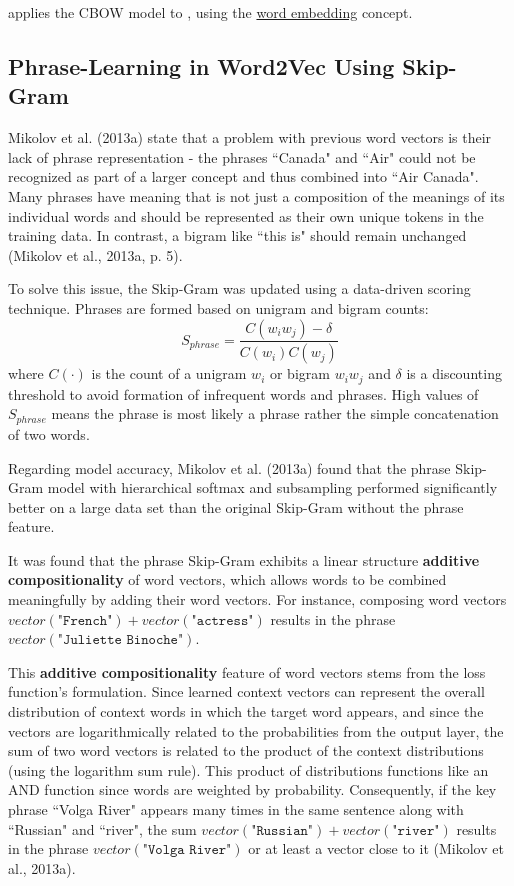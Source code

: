  applies the CBOW model to , using the \hyperref[sec:WordEmbeddings]{word embedding} concept. 


\subsection{Phrase-Learning in Word2Vec Using Skip-Gram}

Mikolov et al. (2013a) state that a problem with previous word vectors is their lack of phrase representation - the phrases ``Canada" and ``Air" could not be recognized as part of a larger concept and thus combined into ``Air Canada". Many phrases have meaning that is not just a composition of the meanings of its individual words and should be represented as their own unique tokens in the training data. In contrast, a bigram like ``this is" should remain unchanged (Mikolov et al., 2013a, p. 5). 

To solve this issue, the Skip-Gram was updated using a data-driven scoring technique. Phrases are formed based on unigram and bigram counts: 
$$
S_{phrase} = \frac{C(w_i w_j) - \delta} {C(w_i)C(w_j)}
$$
where $C(\cdot)$ is the count of a unigram $w_i$ or bigram $w_i w_j$ and $\delta$ is a discounting threshold to avoid formation of infrequent words and phrases. High values of $S_{phrase}$ means the phrase is most likely a phrase rather the simple concatenation of two words. 

Regarding model accuracy, Mikolov et al. (2013a) found that the phrase Skip-Gram model with hierarchical softmax and subsampling performed significantly better on a large data set than the original Skip-Gram without the phrase feature. 

It was found that the phrase Skip-Gram exhibits a linear structure \textbf{additive compositionality} of word vectors, which allows words to be combined meaningfully by adding their word vectors. For instance, composing word vectors $vector(\texttt{"French"}) \! + \! vector(\texttt{"actress"})$ results in the phrase $vector(\texttt{"Juliette Binoche"})$. 

This \textbf{additive compositionality} feature of word vectors stems from the loss function's formulation. Since learned context vectors can represent the overall distribution of context words in which the target word appears, and since the vectors are logarithmically related to the probabilities from the output layer, the sum of two word vectors is related to the product of the context distributions (using the logarithm sum rule). This product of distributions functions like an AND function since words are weighted by probability. Consequently, if the key phrase ``Volga River" appears many times in the same sentence along with ``Russian" and ``river", the sum $vector(\texttt{"Russian"}) \! + \! vector(\texttt{"river"})$ results in the phrase $vector(\texttt{"Volga River"})$ or at least a vector close to it (Mikolov et al., 2013a). 
